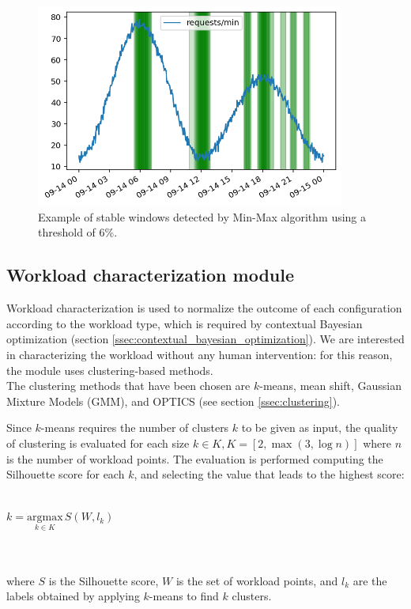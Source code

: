 \documentclass[a4paper, 12pt]{article} %
\begin{document}
	\begin{figure} \centering
		\includegraphics[width=4in]{img/stable_workload_threshold_example.png}
		\caption{Example of stable windows detected by Min-Max algorithm using a threshold of 6\%.}
		\label{fig:threshold_selection}
	\end{figure}


	
	\subsection{Workload characterization module}  \label{ssec:workload_characterization_module}
	Workload characterization is used to normalize the outcome of each configuration according to the workload type, which is required by contextual Bayesian optimization (section \ref{ssec:contextual_bayesian_optimization}). We are interested in characterizing the workload without any human intervention: for this reason, the module uses clustering-based methods. \\
	The clustering methods that have been chosen are $k$-means, mean shift, Gaussian Mixture Models (GMM), and OPTICS (see section \ref{ssec:clustering}).
	
	Since $k$-means requires the number of clusters $k$ to be given as input, the quality of clustering is evaluated for each size $k \in K, K = [2, \max (3, \log n)]$ where $n$ is the number of workload points. The evaluation is performed computing the Silhouette score for each $k$, and selecting the value that leads to the highest score:\\\\
	\centerline{
	$
		k = \underset{k \in K}{\mathrm{argmax}}\, S(W, l_k)
	$
	}\\\\
	where $S$ is the Silhouette score, $W$ is the set of workload points, and $l_k$ are the labels obtained by applying $k$-means to find $k$ clusters.
	
\end{document}
